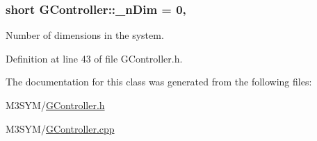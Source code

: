 \hypertarget{classGController_af3276bac24eb8b3b1bca31007b941c0f}{
\subsubsection[{\+\_\+n\+Dim}]{\setlength{\rightskip}{0pt plus 5cm}short G\+Controller\+::\+\_\+n\+Dim = 0\hspace{0.3cm}{\ttfamily [static]}, {\ttfamily [private]}}}\label{classGController_af3276bac24eb8b3b1bca31007b941c0f}


Number of dimensions in the system. 



Definition at line 43 of file G\+Controller.\+h.



The documentation for this class was generated from the following files\+:\begin{DoxyCompactItemize}
\item 
M3\+S\+Y\+M/\hyperlink{GController_8h}{G\+Controller.\+h}\item 
M3\+S\+Y\+M/\hyperlink{GController_8cpp}{G\+Controller.\+cpp}\end{DoxyCompactItemize}
